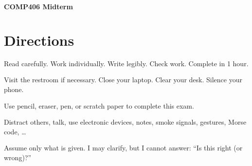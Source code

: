 \documentclass[addpoints,answers]{exam}
\begin{document}
\begin{center}
{\bf COMP406 Midterm}

\end{center}
\vspace{0.2in}

\vspace{0.2in}

\section*{Directions}
Read carefully. Work individually. Write legibly. Check work. Complete in 1 hour.
\begin{description}[leftmargin=!,labelwidth=\widthof{\bfseries Beforehand}]
\item[Beforehand] Visit the restroom if necessary. Close your laptop. Clear your desk. Silence your phone.
\item[DO] Use pencil, eraser, pen, or scratch paper to complete this exam.
\item[DO NOT] Distract others, talk, use electronic devices, notes, smoke signals, gestures, Morse code, \ldots
\item[Confused?] Assume only what is given. I may clarify, but I cannot answer: ``Is this right (or wrong)?''
\end{description}
\end{document}
